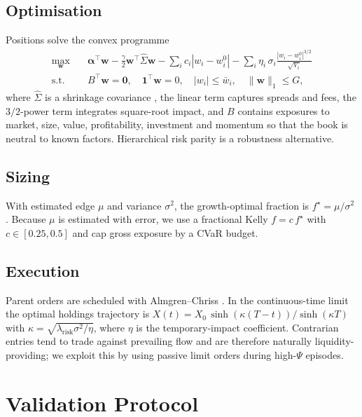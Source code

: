\documentclass[11pt,a4paper]{article}
\theoremstyle{plain}
\theoremstyle{definition}
\theoremstyle{remark}
\newcommand{\w}{\bm{w}}
\begin{document}
\subsection{Optimisation}
Positions solve the convex programme
\begin{equation}
\begin{aligned}
  \max_{\w}\quad & \bm\alpha^\top\w-\frac{\gamma}{2}\w^\top\hat\Sigma\w-\sum_i c_i|w_i-w_i^0|-\sum_i\eta_i\,\sigma_i\frac{|w_i-w_i^0|^{3/2}}{\sqrt{V_i}}\\
  \text{s.t.}\quad & B^\top\w=\bm 0,\quad \bm 1^\top\w=0,\quad |w_i|\le\bar w_i,\quad \|\w\|_1\le G,
\end{aligned}
\end{equation}
where $\hat\Sigma$ is a shrinkage covariance \citep{ledoit2004}, the linear term captures spreads and fees, the $3/2$-power term integrates square-root impact, and $B$ contains exposures to market, size, value, profitability, investment and momentum \citep{fama2015,carhart1997} so that the book is neutral to known factors. Hierarchical risk parity \citep{lopezdeprado2016} is a robustness alternative.

\subsection{Sizing}
With estimated edge $\mu$ and variance $\sigma^2$, the growth-optimal fraction is $f^\star=\mu/\sigma^2$ \citep{kelly1956}. Because $\mu$ is estimated with error, we use a fractional Kelly $f=c\,f^\star$ with $c\in[0.25,0.5]$ and cap gross exposure by a CVaR budget.

\subsection{Execution}
Parent orders are scheduled with Almgren--Chriss \citep{almgren2001}. In the continuous-time limit the optimal holdings trajectory is $X(t)=X_0\,\sinh(\kappa(T-t))/\sinh(\kappa T)$ with $\kappa=\sqrt{\lambda_{\mathrm{risk}}\sigma^2/\eta}$, where $\eta$ is the temporary-impact coefficient. Contrarian entries tend to trade against prevailing flow and are therefore naturally liquidity-providing; we exploit this by using passive limit orders during high-$\Psi$ episodes.

\section{Validation Protocol}\label{sec:validation}
\end{document}
